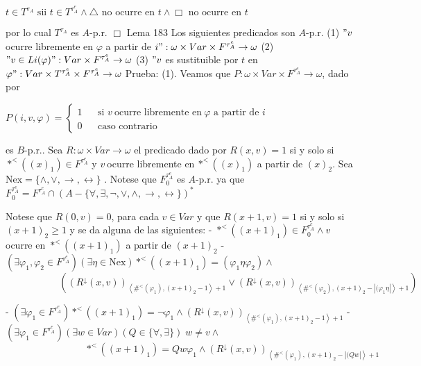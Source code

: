 \(\displaystyle t\in T^{\tau _{A}}\text{ sii }t\in T^{\tau _{A}^{e}}\wedge \triangle \text{ no ocurre en }t\wedge \Box \text{ no ocurre en }t \)

por lo cual \(T^{\tau _{A}}\) es \(A\)-p.r. \(\Box\)
Lema 183 Los siguientes predicados son \(A\)-p.r.
(1) \("v\) ocurre libremente en \(\varphi \) a partir de \(i":\omega \times Var\times F^{\tau _{A}^{e}}\rightarrow \omega \)
(2) \("v\in Li(\varphi )":Var\times F^{\tau _{A}^{e}}\rightarrow \omega \)
(3) \("v\) es sustituible por \(t\) en \(\varphi ":Var\times T^{\tau _{A}^{e}}\times F^{\tau _{A}^{e}}\rightarrow \omega \)
Prueba: (1). Veamos que \(P:\omega \times Var\times F^{\tau _{A}^{e}}\rightarrow \omega \), dado por

\(\displaystyle P(i,v,\varphi )=\left\{ \begin{array}{ccl} 1 & & \text{si }v\mathit{\ }\text{ocurre libremente en}\mathit{\ }\varphi \text{ a partir de }i \\ 0 & & \text{caso contrario} \end{array} \right. \)

es \(B\)-p.r.. Sea \(R:\omega \times Var\rightarrow \omega \) el predicado dado por \(R(x,v)=1\) si y solo si \(\ast ^{< }((x)_{1})\in F^{\tau _{A}^{e}}\) y \(v \mathit{\ }\)ocurre libremente en\(\mathit{\ }\ast ^{< }((x)_{1})\) a partir de \( (x)_{2}\). Sea \(\mathrm{Nex}=\{\wedge ,\vee ,\rightarrow ,\leftrightarrow \}\) . Notese que \(F_{0}^{\tau _{A}^{e}}\) es \(A\)-p.r. ya que
\(\displaystyle F_{0}^{\tau _{A}^{e}}=F^{\tau _{A}^{e}}\cap (A-\{\forall ,\exists ,\lnot ,\vee ,\wedge ,\rightarrow ,\leftrightarrow \})^{\ast } \)

Notese que \(R(0,v)=0\), para cada \(v\in Var\) y que \(R(x+1,v)=1\) si y solo si \( (x+1)_{2}\geq 1\) y se da alguna de las siguientes:
- \(\ast ^{< }((x+1)_{1})\in F_{0}^{\tau _{A}^{e}}\wedge v\) ocurre en \( \ast ^{< }((x+1)_{1})\) a partir de \((x+1)_{2}\)
- \((\exists \varphi _{1},\varphi _{2}\in F^{\tau _{A}^{e}})(\exists \eta \in \mathrm{Nex})\ast ^{< }((x+1)_{1})=(\varphi _{1}\eta \varphi _{2})\wedge \)
\(\ \ \ \ \ \ \ \ \ \ \ \ \ \ \ \ \ \ \ \ \ \ \ \ \ \left( (R^{\downarrow }(x,v))_{\left\langle \#^{< }(\varphi _{1}),(x+1)_{2}-1\right\rangle +1}\vee (R^{\downarrow }(x,v))_{\left\langle \#^{< }(\varphi _{2}),(x+1)_{2}-\left\vert (\varphi _{1}\eta \right\vert \right\rangle +1}\right) \)

- \((\exists \varphi _{1}\in F^{\tau _{A}^{e}})\ast ^{< }((x+1)_{1})=\lnot \varphi _{1}\wedge (R^{\downarrow }(x,v))_{\left\langle \#^{< }(\varphi _{1}),(x+1)_{2}-1\right\rangle +1}\)
- \((\exists \varphi _{1}\in F^{\tau _{A}^{e}})(\exists w\in Var)(Q\in \{\forall ,\exists \})\;w\neq v\wedge \)
\(\ \ \ \ \ \ \ \ \ \ \ \ \ \ \ \ \ \ \ \ \ \ \ \ \ \ \ \ \ \ \ \ \ \ \ \ \ \ast ^{< }((x+1)_{1})=Qw\varphi _{1}\wedge (R^{\downarrow }(x,v))_{\left\langle \#^{< }(\varphi _{1}),(x+1)_{2}-\left\vert (Qw\right\vert \right\rangle +1}\)

